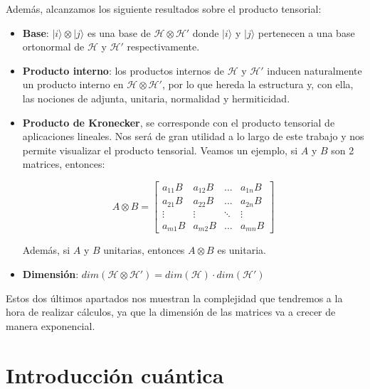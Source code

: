 Además, alcanzamos los siguiente resultados sobre el producto tensorial:
\begin{itemize}
    \item \textbf{Base}: $|i\rangle \otimes |j\rangle$ es una base de $\mathscr{H} \otimes \mathscr{H}'$ donde $|i\rangle$ y $|j\rangle$ pertenecen a una base ortonormal de $\mathscr{H}$ y $\mathscr{H}'$ respectivamente. 
    
    \item \textbf{Producto interno}: los productos internos de $\mathscr{H}$ y $\mathscr{H}'$ inducen naturalmente un producto interno en $\mathscr{H} \otimes \mathscr{H}'$, por lo que hereda la estructura y, con ella, las nociones de adjunta, unitaria, normalidad y hermiticidad.
    
    \item \textbf{Producto de Kronecker}, se corresponde con el producto tensorial de aplicaciones lineales. Nos será de gran utilidad a lo largo de este trabajo y nos permite visualizar el producto tensorial. Veamos un ejemplo, si $A$ y $B$ son 2 matrices, entonces:\newline

        \begin{equation}
        A\otimes B = \begin{bmatrix}
        a_{11}B & a_{12}B & ... & a_{1n}B\\
        a_{21}B & a_{22}B & ... & a_{2n}B\\
        \vdots & \vdots & \ddots & \vdots\\
        a_{m1}B & a_{m2}B & ... & a_{mn}B
        \end{bmatrix}
        \end{equation}

    Además, si $A$ y $B$ unitarias, entonces $A\otimes B$ es unitaria.

    \vspace{5pt}
    \item \textbf{Dimensión}: $dim(\mathscr{H} \otimes \mathscr{H}')=dim(\mathscr{H})\cdot dim(\mathscr{H}')$
\end{itemize}

Estos dos últimos apartados nos muestran la complejidad que tendremos a la hora de realizar cálculos, ya que la dimensión de las matrices va a crecer de manera exponencial.

\newpage

\section{Introducción cuántica}
\label{Sec2.2:Fisica}

